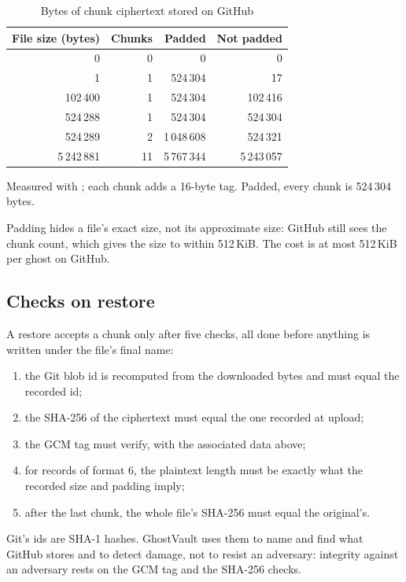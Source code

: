 \begin{table}[t]
\caption{Bytes of chunk ciphertext stored on GitHub}\label{tab:padding}
\centering\footnotesize
\begin{tabular}{@{}rrrr@{}}
\toprule
\textbf{File size (bytes)} & \textbf{Chunks} & \textbf{Padded} & \textbf{Not padded} \\
\midrule
0 & 0 & 0 & 0 \\
1 & 1 & 524\,304 & 17 \\
102\,400 & 1 & 524\,304 & 102\,416 \\
524\,288 & 1 & 524\,304 & 524\,304 \\
524\,289 & 2 & 1\,048\,608 & 524\,321 \\
5\,242\,881 & 11 & 5\,767\,344 & 5\,243\,057 \\
\bottomrule
\end{tabular}

\vspace{2pt}\raggedright\scriptsize Measured with ; each chunk adds a 16-byte
tag. Padded, every chunk is 524\,304 bytes.
\end{table}

Padding hides a file's exact size, not its approximate size: GitHub still sees the chunk count,
which gives the size to within 512\,KiB. The cost is at most 512\,KiB per ghost on GitHub.

\subsection{Checks on restore}\label{sec:checks}
A restore accepts a chunk only after five checks, all done before anything is written under the
file's final name:
\begin{enumerate}
\item the Git blob id is recomputed from the downloaded bytes and must equal the recorded id;
\item the SHA-256 of the ciphertext must equal the one recorded at upload;
\item the GCM tag must verify, with the associated data above;
\item for records of format 6, the plaintext length must be exactly what the recorded size and
padding imply;
\item after the last chunk, the whole file's SHA-256 must equal the original's.
\end{enumerate}
Git's ids are SHA-1 hashes. GhostVault uses them to name and find what GitHub stores and to detect
damage, not to resist an adversary: integrity against an adversary rests on the GCM tag and the
SHA-256 checks.

